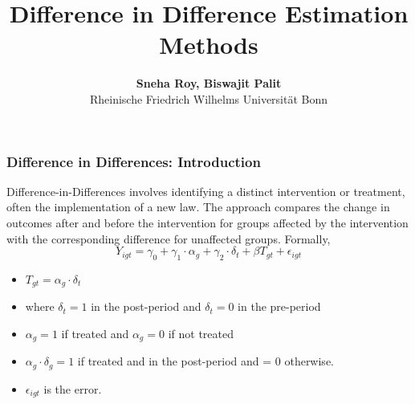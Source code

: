 \documentclass[11pt, aspectratio=169]{beamer}
\begin{document}
\title{Difference in Difference Estimation Methods}

\author[Sneha Roy, Biswajit Palit]
{
{\bf Sneha Roy, Biswajit Palit}\\
{\small Rheinische Friedrich Wilhelms Universität Bonn}\\[1ex]
}


\begin{frame}
    \titlepage
    \note{~}
\end{frame}


\begin{frame}[t]
    \frametitle{Difference in Differences: Introduction}

    Difference-in-Differences involves identifying a distinct intervention or treatment, often the implementation of a new law. 
    The approach compares the change in outcomes after and before the intervention for groups affected by the intervention with the corresponding difference for unaffected groups.
    Formally, 
    \begin{equation}
        Y_{igt} = \gamma_{0} + \gamma_{1} \cdot \alpha_g + \gamma_{2} \cdot \delta_t + \beta T_{gt} + \epsilon_{igt} 
    \end{equation}

    \begin{itemize}
        \item $T_{gt} = \alpha_{g} \cdot \delta_{t}$ 
        \item where $\delta_{t} = 1$ in the post-period and $\delta_{t} = 0$ in the pre-period  
        \item $\alpha_{g} = 1$ if treated and $\alpha_{g} = 0$ if not treated
        \item $\alpha_{g} \cdot \delta_{g} = 1$ if treated and in the post-period and = 0 otherwise.
        \item $\epsilon_{igt}$ is the error.
    \end{itemize}

\end{frame}
\end{document}
